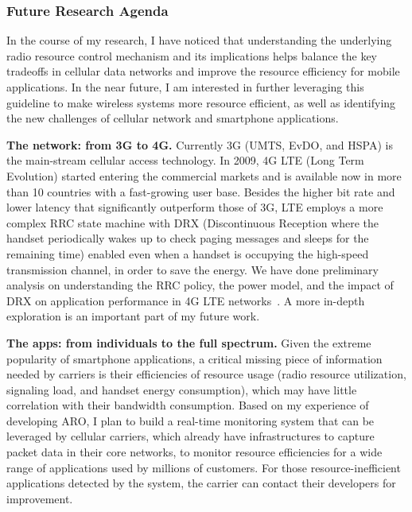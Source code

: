 \documentclass[10pt]{article}
\begin{document}
\begin{small}
\subsubsection*{Future Research Agenda}

In the course of my research, I have noticed that understanding the underlying radio resource control mechanism and its implications helps balance the key tradeoffs in cellular data networks and improve the resource efficiency for mobile applications. In the near future, I am interested in further leveraging this guideline to make wireless systems more resource efficient, as well as identifying the new challenges of cellular network and smartphone applications.

\textbf{The network: from 3G to 4G.} Currently 3G (UMTS, EvDO, and HSPA) is the main-stream cellular access technology. In 2009, 4G LTE (Long Term Evolution) started entering the commercial markets and is available now in more than 10 countries with a fast-growing user base. Besides the higher bit rate and lower latency that significantly outperform those of 3G, LTE employs a more complex RRC state machine with DRX (Discontinuous Reception where the handset periodically wakes up to check paging messages and sleeps for the remaining time) enabled even when a handset is occupying the high-speed transmission channel, in order to save the energy. We have done preliminary analysis on understanding the RRC policy, the power model, and the impact of DRX on application performance in 4G LTE networks~\cite{huang12_mobisys}. A more in-depth exploration is an important part of my future work.

\textbf{The apps: from individuals to the full spectrum.} Given the extreme popularity of smartphone applications, a critical missing piece of information needed by carriers is their efficiencies of resource usage (radio resource utilization, signaling load, and handset energy consumption), which may have little correlation with their bandwidth consumption. Based on my experience of developing ARO, I plan to build a real-time monitoring system that can be leveraged by cellular carriers, which already have infrastructures to capture packet data in their core networks, to monitor resource efficiencies for a wide range of applications used by millions of customers. For those resource-inefficient applications detected by the system, the carrier can contact their developers for improvement.


\end{small}
\end{document}
